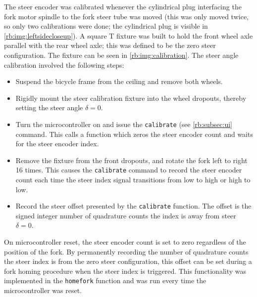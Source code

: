 The steer encoder was calibrated whenever the cylindrical plug interfacing the
fork motor spindle to the fork steer tube was moved (this was only moved twice,
so only two calibrations were done; the cylindrical plug is visible in
\autoref{rb:img:leftsidecloseup}). A square T fixture was built to hold the
front wheel axle parallel with the rear wheel axle; this was defined to be the
zero steer configuration. The fixture can be seen in
\autoref{rb:img:calibration}. The steer angle calibration involved the
following steps:
\begin{itemize}
  \item Suspend the bicycle frame from the ceiling and remove both wheels.
  \item Rigidly mount the steer calibration fixture into the wheel dropouts,
    thereby setting the steer angle $\delta=0$.
  \item Turn the microcontroller on and issue the \verb|calibrate| (see
    \autoref{rb:subsec:ui} command. This calls a function which zeros the
    steer encoder count and waits for the steer encoder index.
  \item Remove the fixture from the front dropouts, and rotate the fork left to
    right 16 times. This causes the \verb|calibrate| command to record the
    steer encoder count each time the steer index signal transitions from low
    to high or high to low.
  \item Record the steer offset presented by the \verb|calibrate| function. The
    offset is the signed integer number of quadrature counts the index is away
    from steer $\delta=0$.
\end{itemize}
On microcontroller reset, the steer encoder count is set to zero regardless of
the position of the fork. By permanently recording the number of quadrature
counts the steer index is from the zero steer configuration, this offset
can be set during a fork homing procedure when the steer index is triggered.
This functionality was implemented in the \verb|homefork| function and was run
every time the microcontroller was reset.

